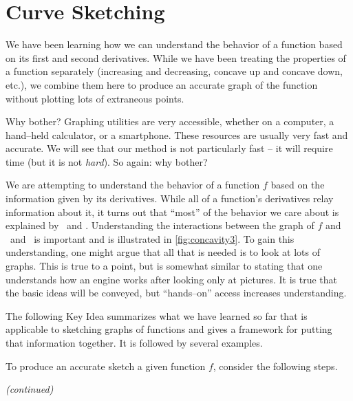 \section{Curve Sketching}\label{sec:sketch}

We have been learning how we can understand the behavior of a function based on its first and second derivatives. While we have been treating the properties of a function separately (increasing and decreasing, concave up and concave down, etc.), we combine them here to produce an accurate graph of the function without plotting lots of extraneous points.

Why bother? Graphing utilities are very accessible, whether on a computer, a hand--held calculator, or a smartphone. These resources are usually very fast and accurate. We will see that our method is not particularly fast -- it will require time (but it is not \textit{hard}). So again: why bother?


We are attempting to understand the behavior of a function $f$ based on the information given by its derivatives. While all of a function's derivatives relay information about it, it turns out that ``most'' of the behavior we care about is explained by \fp\ and \fpp. Understanding the interactions between the graph of $f$ and \fp\ and \fpp\ is important and is illustrated in \autoref{fig:concavity3}. To gain this understanding, one might argue that all that is needed is to look at lots of graphs. This is true to a point, but is somewhat similar to stating that one understands how an engine works after looking only at pictures. It is true that the basic ideas will be conveyed, but ``hands--on'' access increases understanding.

The following Key Idea summarizes what we have learned so far that is applicable to sketching graphs of functions and gives a framework for putting that information together. It is followed by several examples.

{To produce an accurate sketch a given function $f$, consider the following steps.
\iflatexml{}
 \textit{\small(continued)}
 }

